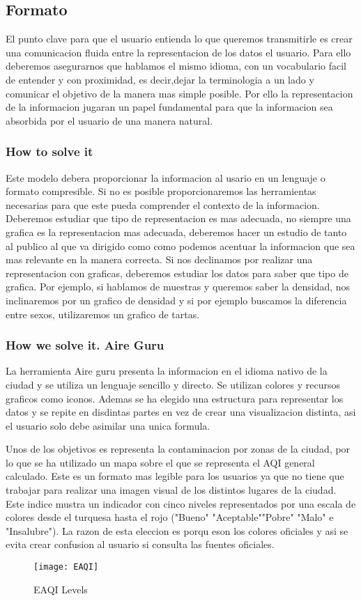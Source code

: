 \subsection{Formato}
El punto clave para que el usuario entienda lo que queremos transmitirle es crear una comunicacion fluida entre la representacion
de los datos el usuario. Para ello  deberemos asegurarnos que hablamos el mismo idioma, con un vocabulario facil de entender y
con proximidad, es decir,dejar la terminologia a un lado y comunicar el objetivo de la manera mas simple posible.
Por ello la representacion de la informacion jugaran un papel fundamental para que la 
informacion sea absorbida por el usuario de una manera natural.


\subsubsection{How to solve it} 
Este modelo debera proporcionar la informacion al usario en un lenguaje o formato compresible. Si no es posible proporcionaremos las 
herramientas necesarias para que este pueda comprender el contexto de la informacion.
Deberemos estudiar que tipo de representacion es mas adecuada, no siempre una grafica es la representacion mas adecuada, deberemos hacer un 
estudio de tanto al publico al que va dirigido como como podemos acentuar la informacion que sea mas relevante en la manera 
correcta.
Si nos declinamos por realizar una representacion con graficas, deberemos estudiar los datos para saber que tipo de grafica. Por ejemplo, 
si hablamos de muestras y queremos saber la densidad, nos inclinaremos por un grafico de densidad y si por ejemplo buscamos la diferencia 
entre sexos, utilizaremos un grafico de tartas.

\subsubsection{How we solve it. Aire Guru} 
La herramienta Aire guru presenta la informacion en el idioma nativo de la ciudad y se utiliza un lenguaje sencillo y directo.
Se utilizan colores y recursos graficos como iconos. Ademas se ha elegido una estructura para representar los datos y se repite en disdintas 
partes en vez de crear una visualizacion distinta, asi el usuario solo debe asimilar una unica formula.

Unos de los objetivos es representa la contaminacion por zonas de la ciudad, por lo que se ha utilizado un mapa sobre el que se representa
 el AQI general calculado. Este es un formato mas legible para los usuarios ya que no tiene que trabajar para realizar una imagen visual
 de los distintos lugares de la ciudad. Este indice mustra un indicador con cinco niveles representados por una escala de colores desde el 
 turquesa hasta el rojo ("Bueno" "Aceptable""Pobre" "Malo" e "Insalubre"). La razon de esta eleccion es porqu eson los colores oficiales y 
 asi se evita crear confusion al usuario si consulta las fuentes oficiales.
 \newpage
 \begin{figure}[ht]
    \centering
    \texttt{[image: EAQI]}
    \caption{EAQI Levels}
\end{figure}

